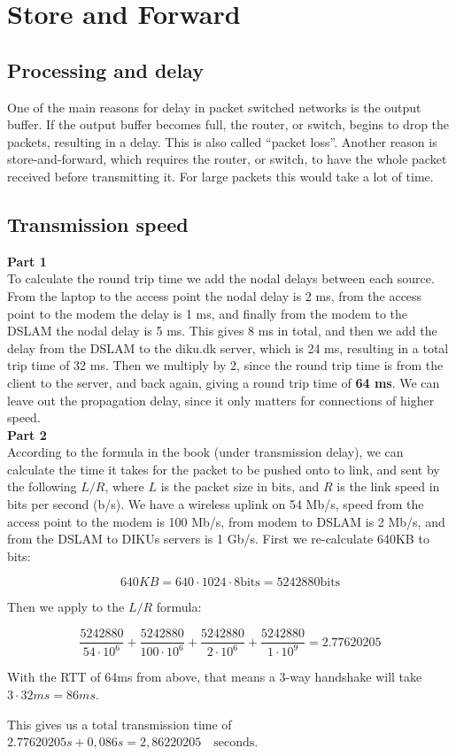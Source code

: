\section{Store and Forward}
\subsection{Processing and delay}
One of the main reasons for delay in packet switched networks is the output
buffer. If the output buffer becomes full, the router, or switch, begins to drop
the packets, resulting in a delay. This is also called ``packet loss''. Another
reason is store-and-forward, which requires the router, or switch, to have the
whole packet received before transmitting it. For large packets this would take
a lot of time.

\subsection{Transmission speed}
\textbf{Part 1}\\
To calculate the round trip time we add the nodal delays between each source.
From the laptop to the access point the nodal delay is 2 ms, from the access
point to the modem the delay is 1 ms, and finally from the modem to the DSLAM
the nodal delay is 5 ms. This gives 8 ms in total, and then we add the delay from the
DSLAM to the diku.dk server, which is 24 ms, resulting in a total trip time of
32 ms. Then we multiply by 2, since the round trip time is from the client to
the server, and back again, giving a round trip time of \textbf{64 ms}. We can
leave out the propagation delay, since it only matters for connections of higher
speed. \\

\noindent \textbf{Part 2}\\
According to the formula in the book (under transmission delay), we can
calculate the time it takes for the packet to be pushed onto to link, and sent
by the following $L/R$, where $L$ is the packet size in bits, and $R$ is the
link speed in bits per second (b/s). We have a wireless uplink on 54 Mb/s, speed
from the access point to the modem is 100 Mb/s, from modem to DSLAM is 2 Mb/s,
and from the DSLAM to DIKUs servers is 1 Gb/s. First we re-calculate 640KB to bits:

\[
	640KB = 640 \cdot 1024 \cdot 8 \text{bits} = 5242880 \text{bits}
\]

Then we apply to the $L/R$ formula:

\[
\frac{5242880}{54 \cdot 10^6} + \frac{5242880}{100 \cdot 10^6} +
\frac{5242880}{2 \cdot 10^6} + \frac{5242880}{1 \cdot 10^9} = 2.77620205
\]

With the RTT of 64ms from above, that means a 3-way handshake will take $3 \cdot 32ms = 86ms$.

This gives us a total transmission time of $2.77620205s + 0,086s = 2,86220205 \quad \text{seconds}$.
